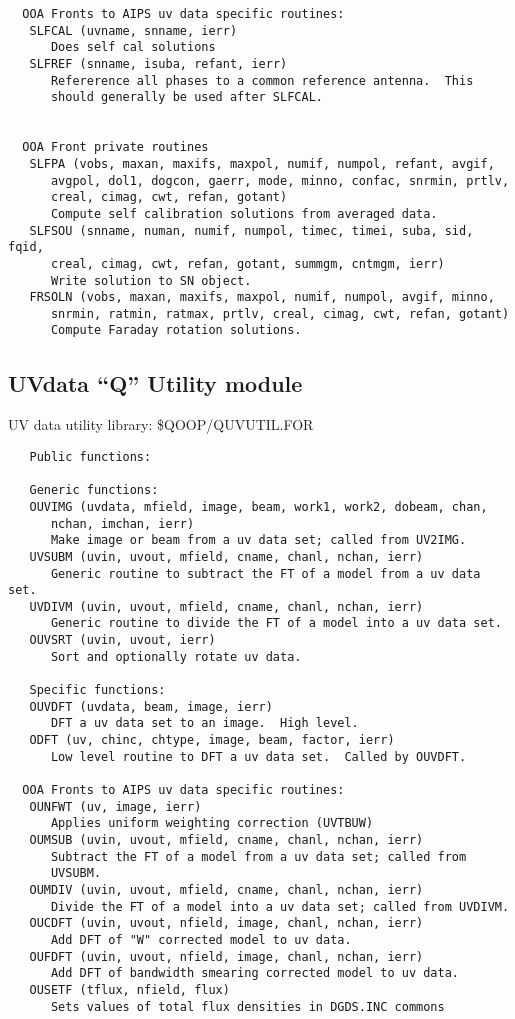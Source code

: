 {\begin{verbatim}
  OOA Fronts to AIPS uv data specific routines:
   SLFCAL (uvname, snname, ierr)
      Does self cal solutions
   SLFREF (snname, isuba, refant, ierr)
      Refererence all phases to a common reference antenna.  This
      should generally be used after SLFCAL.


  OOA Front private routines
   SLFPA (vobs, maxan, maxifs, maxpol, numif, numpol, refant, avgif,
      avgpol, dol1, dogcon, gaerr, mode, minno, confac, snrmin, prtlv,
      creal, cimag, cwt, refan, gotant)
      Compute self calibration solutions from averaged data.
   SLFSOU (snname, numan, numif, numpol, timec, timei, suba, sid, fqid,
      creal, cimag, cwt, refan, gotant, summgm, cntmgm, ierr)
      Write solution to SN object.
   FRSOLN (vobs, maxan, maxifs, maxpol, numif, numpol, avgif, minno,
      snrmin, ratmin, ratmax, prtlv, creal, cimag, cwt, refan, gotant)
      Compute Faraday rotation solutions.
\end{verbatim}}

\subsection{UVdata ``Q'' Utility module}
   UV data utility library: \$QOOP/QUVUTIL.FOR
{\small\begin{verbatim}
   Public functions:

   Generic functions:
   OUVIMG (uvdata, mfield, image, beam, work1, work2, dobeam, chan,
      nchan, imchan, ierr)
      Make image or beam from a uv data set; called from UV2IMG.
   UVSUBM (uvin, uvout, mfield, cname, chanl, nchan, ierr)
      Generic routine to subtract the FT of a model from a uv data set.
   UVDIVM (uvin, uvout, mfield, cname, chanl, nchan, ierr)
      Generic routine to divide the FT of a model into a uv data set.
   OUVSRT (uvin, uvout, ierr)
      Sort and optionally rotate uv data.

   Specific functions:
   OUVDFT (uvdata, beam, image, ierr)
      DFT a uv data set to an image.  High level.
   ODFT (uv, chinc, chtype, image, beam, factor, ierr)
      Low level routine to DFT a uv data set.  Called by OUVDFT.

  OOA Fronts to AIPS uv data specific routines:
   OUNFWT (uv, image, ierr)
      Applies uniform weighting correction (UVTBUW)
   OUMSUB (uvin, uvout, mfield, cname, chanl, nchan, ierr)
      Subtract the FT of a model from a uv data set; called from
      UVSUBM.
   OUMDIV (uvin, uvout, mfield, cname, chanl, nchan, ierr)
      Divide the FT of a model into a uv data set; called from UVDIVM.
   OUCDFT (uvin, uvout, nfield, image, chanl, nchan, ierr)
      Add DFT of "W" corrected model to uv data.
   OUFDFT (uvin, uvout, nfield, image, chanl, nchan, ierr)
      Add DFT of bandwidth smearing corrected model to uv data.
   OUSETF (tflux, nfield, flux)
      Sets values of total flux densities in DGDS.INC commons

\end{verbatim}}
